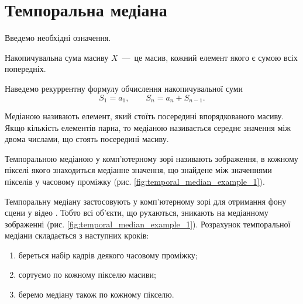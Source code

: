 \section{Темпоральна медіана}

Введемо необхідні означення.

\begin{definition}
    Накопичувальна сума масиву \cite{integral_image} $X$~---~це масив, кожний елемент якого є сумою всіх попередніх.
\end{definition}

Наведемо рекуррентну формулу обчислення накопичувальної суми
\begin{equation}
    S_1 = a_1, \qquad S_n = a_n + S_{n-1}.
    \label{eq:summed_table_formula}
\end{equation}

\begin{definition}
    Медіаною \cite{median_in_statistics} називають елемент, який стоїть посередині впорядкованого масиву.
    Якщо кількість елементів парна, то медіаною називається середнє значення між двома числами,
    що стоять посередині масиву.
\end{definition}

\begin{definition}
    Темпоральною медіаною у комп'ютерному зорі називають зображення,
    в кожному пікселі якого знаходиться медіанне значення, що знайдене між значеннями пікселів у часовому проміжку
    (рис. \ref{fig:temporal_median_example_1}).
\end{definition}

Темпоральну медіану застосовують у комп'ютерному зорі для отримання
фону сцени у відео \cite{temporal_median_example_1}.
Тобто всі об'єкти, що рухаються, зникають на медіанному зображенні
(рис. \ref{fig:temporal_median_example_1}).
Розрахунок темпоральної медіани складається з наступних кроків:
\begin{enumerate}
    \item береться набір кадрів деякого часовому проміжку;
    \item сортуємо по кожному пікселю масиви;
    \item беремо медіану також по кожному пікселю.
\end{enumerate}

